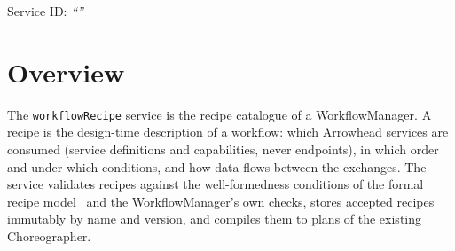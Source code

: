 \documentclass[a4paper]{arrowhead}
\begin{document}
\ArrowheadSetup

\begin{center}
  \vspace*{1cm}
  \huge{\arrowtitle}

  \vspace*{0.2cm}
  \LARGE{\arrowtype}
  \vspace*{1cm}

  \Large{Service ID: \textit{``\arrowid''}}
  \vspace*{\fill}

  

  \vspace*{1cm}
  \vspace*{\fill}

  \begin{abstract}
    This document describes the \texttt{workflowRecipe} service of the Eclipse Arrowhead workflow support systems, which validates, registers, lists, retires and compiles workflow recipes. It is provided by the WorkflowManager system, service version 1.0.0, documentation edition 5.4.0.
  \end{abstract}

  \vspace*{1cm}
\end{center}

\newpage

\tableofcontents
\newpage

\section{Overview}
\label{sec:overview}
The \texttt{workflowRecipe} service is the recipe catalogue of a WorkflowManager. A recipe is the
design-time description of a workflow: which Arrowhead services are consumed (service definitions and capabilities,
never endpoints), in which order and under which conditions, and how data flows between the exchanges. The service
validates recipes against the well-formedness conditions of the formal recipe model~\cite{varga2026} and the
WorkflowManager's own checks, stores accepted recipes immutably by name and version, and compiles them to plans of the
existing Choreographer.
\end{document}
